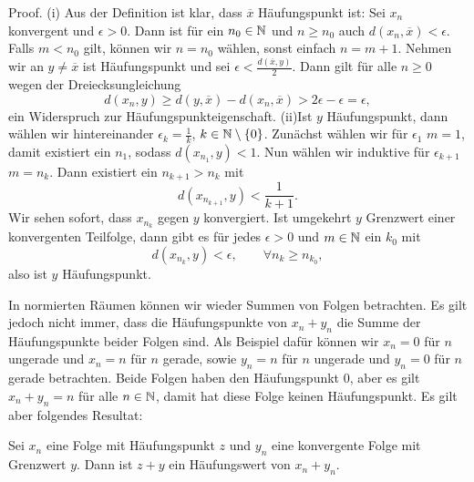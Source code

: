 \begin{emphBox}{}{}
Proof.  (i) Aus der Definition ist klar, dass \(\overline{x}\) Häufungspunkt ist: Sei \(x_n\) konvergent und \(\epsilon > 0\). Dann ist für ein \(n_0 \in \mathbb{N}\) und \(n \geq n_0\) auch \(d(x_n, \overline{x}) < \epsilon\). Falls \(m < n_0\) gilt, können wir \(n=n_0\) wählen, sonst einfach \(n=m+1\). Nehmen wir an \(y \neq \overline{x}\) ist Häufungspunkt und sei \(\epsilon < \frac{d(\overline{x},y)}2\). Dann gilt für alle \(n \geq 0\) wegen der Dreiecksungleichung
\begin{equation*}
 d(x_n,y) \geq d(y,\overline{x}) - d(x_n,\overline{x}) > 2 \epsilon - \epsilon = \epsilon,
\end{equation*}
ein Widerspruch zur Häufungspunkteigenschaft.
(ii)Ist \(y\) Häufungspunkt, dann wählen wir hintereinander \(\epsilon_k = \frac{1}k\), \(k \in \mathbb{N} \setminus \{0\}\). Zunächst wählen wir für \(\epsilon_1\) \(m=1\), damit existiert ein \(n_1\), sodass \(d(x_{n_1},y) < 1\). Nun wählen wir induktive für \(\epsilon_{k+1}\)  \(m=n_k\). Dann existiert ein \(n_{k+1} > n_k\) mit
\begin{equation*}
 d(x_{n_{k+1}},y) < \frac{1}{k+1}.
\end{equation*}
Wir sehen sofort, dass \(x_{n_k}\) gegen \(y\) konvergiert.
Ist umgekehrt \(y\) Grenzwert einer konvergenten Teilfolge, dann gibt es für jedes \(\epsilon >0 \) und \(m \in \mathbb{N}\) ein \(k_0 \) mit
\begin{equation*}
 d(x_{n_k},y) < \epsilon, \qquad \forall n_k \geq n_{k_0},
\end{equation*}
also ist \(y\) Häufungspunkt.
\end{emphBox}

In normierten Räumen können wir wieder Summen von Folgen betrachten. Es gilt jedoch nicht immer, dass die Häufungspunkte von \(x_n+y_n\) die Summe der Häufungspunkte beider Folgen sind. Als Beispiel dafür können wir \(x_n=0\) für \(n\) ungerade und \(x_n=n\) für \(n\) gerade, sowie \(y_n=n\) für \(n\) ungerade und \(y_n=0\) für \(n\) gerade betrachten. Beide Folgen haben den Häufungspunkt \(0\), aber es gilt \(x_n+y_n = n\) für alle \(n \in \mathbb{N}\), damit hat diese Folge keinen Häufungspunkt. Es gilt aber folgendes Resultat:
\label{metrik/teilfolgen:lemma-4}
\begin{lemma}{}{}



Sei \(x_n\) eine Folge mit Häufungspunkt \(z\) und \(y_n\) eine konvergente Folge mit Grenzwert \(y\). Dann ist \(z+y\) ein Häufungswert von \(x_n + y_n\).
\end{lemma}

